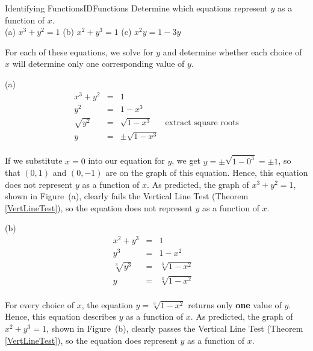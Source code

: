 \begin{example}{Identifying Functions}{IDFunctions}
	Determine which equations represent $y$ as a function of $x$.  \\
	
\hspace{4mm} (a) \hspace{2mm} $x^3 + y^2 = 1$ \hspace{1.5cm} (b) \hspace{2mm} $x^2 + y^3 = 1$
	\hspace{1.5cm} (c) \hspace{2mm} $x^2y = 1 - 3y$
\end{example}
\begin{solution}	
For each of these equations, we solve for $y$ and determine whether each choice of $x$ will determine only one corresponding value of $y$.
	
(a) 		
 \[ \begin{array}{rclr} 
		x^3 + y^2 & = & 1 & \\
		y^2 & = & 1 - x^3 & \\
		\sqrt{y^2} & = & \sqrt{1 - x^3} & \mbox{extract square roots} \\
		y & = & \pm \sqrt{1 - x^3} & \\ 
		\end{array} \]
		
If we substitute $x=0$ into our equation for $y$, we get  $y = \pm \sqrt{1 - 0^3} = \pm 1$, so that $(0,1)$ and $(0,-1)$ are on the graph of this equation. Hence, this equation does not represent $y$ as a function of $x$. As predicted, the graph of $x^3+y^2=1$, shown in Figure~(a), clearly fails the Vertical Line Test (Theorem \ref{VertLineTest}), so the equation does not represent $y$ as a function of $x$.\\   

\vspace{3mm}
		
(b)
  \[ \begin{array}{rclr} 
		x^2 + y^3 & = & 1 & \\
		y^3 & = & 1 - x^2 & \\
		\sqrt[3]{y^3} & = & \sqrt[3]{1 - x^2} & \\
		y & = & \sqrt[3]{1 - x^2} & \\ 
		\end{array} \]
		
For every choice of $x$, the equation $y =  \sqrt[3]{1 - x^2}$ returns only \textbf{one} value of $y$.  Hence, this equation describes $y$ as a function of $x$. As predicted, the graph of $x^2+y^3=1$, shown in Figure~(b), clearly passes the Vertical Line Test (Theorem \ref{VertLineTest}), so the equation does represent $y$ as a function of $x$.\\   
		

\end{solution}
